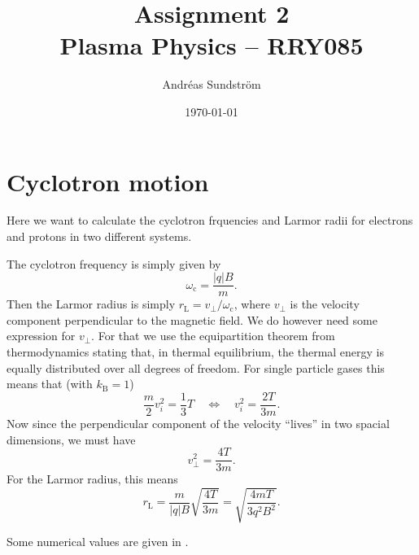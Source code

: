 \documentclass[11pt,a4paper, 
swedish, english %
]{article}
\newcommand{\wc}{\ensuremath{\omega_{\text{c}}}}
\newcommand{\rL}{\ensuremath{r_{\text{L}}}}
\begin{document}


\title{Assignment 2 \\
{\Large Plasma Physics -- RRY085}}
\author{Andréas Sundström}
\date{\today}%

\maketitle




\section{Cyclotron motion}
Here we want to calculate the cyclotron frquencies and Larmor radii
for electrons and protons in two different systems. 

The cyclotron frequency is simply given by
\begin{equation} \label{eq1:wc}
\wc = \frac{|q|B}{m}.
\end{equation}
Then the Larmor radius is simply $\rL=v_\perp/\wc$, where $v_\perp$ is
the velocity component perpendicular to the magnetic field. We do
however need some expression for $v_\perp$. For that we use the
equipartition theorem from thermodynamics stating that, in thermal
equilibrium, the thermal energy is equally distributed over all
degrees of freedom. For single particle gases this means that 
(with $k_\text{B}=1$)
\begin{equation}
\frac{m}{2} v_i^2 = \frac{1}{3} T
\quad\Longleftrightarrow\quad
v_i^2 = \frac{2 T}{3m}.
\end{equation}
Now since the perpendicular component of the velocity ``lives'' in two
spacial dimensions, we must have
\begin{equation}
v_\perp^2 = \frac{4 T}{3m}.
\end{equation}
For the Larmor radius, this means
\begin{equation}
\rL = \frac{m}{|q|B}\sqrt{\frac{4 T}{3m}}
=\sqrt{\frac{4m T}{3q^2B^2}}.
\end{equation}

Some numerical values are given in .
\end{document}
